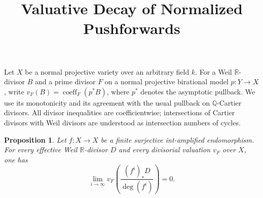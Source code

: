 \documentclass[11pt,a4paper]{article}
\title{Valuative Decay of Normalized Pushforwards}
\author{}
\date{}
\newtheorem{proposition}{Proposition}
\newcommand{\Q}{\mathbb Q}
\newcommand{\R}{\mathbb R}
\DeclareMathOperator{\coeff}{coeff}
\begin{document}
\maketitle
\vspace{-2.2em}

Let $X$ be a normal projective variety over an arbitrary field $k$.
For a Weil $\R$-divisor $B$ and a prime divisor
$F$ on a normal projective birational model $p:Y\to X$, write
$v_F(B)=\coeff_F(p^*B)$, where $p^*$ denotes the asymptotic pullback.
We use its monotonicity and its agreement with the usual pullback on
$\Q$-Cartier divisors. All divisor inequalities are coefficientwise;
intersections of Cartier divisors with Weil divisors are understood
as intersection numbers of cycles.

\begin{proposition}
Let $f:X\to X$ be a finite surjective int-amplified endomorphism.
For every effective Weil $\R$-divisor $D$ and every divisorial valuation
$v_F$ over $X$, one has
\[
 \lim_{i\to\infty}
 v_F\!\left(\frac{(f^i)_*D}{\deg(f^i)}\right)=0.
\]
\end{proposition}
\end{document}
